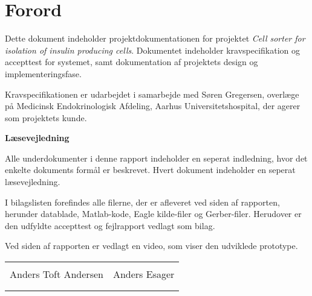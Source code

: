 \chapter*{Forord}

Dette dokument indeholder projektdokumentationen for projektet \textit{Cell sorter for isolation of insulin producing cells}. Dokumentet indeholder kravspecifikation og accepttest for systemet, samt dokumentation af projektets design og implementeringsfase. 

Kravspecifikationen er udarbejdet i samarbejde med Søren Gregersen, overlæge på Medicinsk Endokrinologisk Afdeling, Aarhus Universitetshospital, der agerer som projektets kunde. 

\textbf{Læsevejledning}

Alle underdokumenter i denne rapport indeholder en seperat indledning, hvor det enkelte dokuments formål er beskrevet. Hvert dokument indeholder en seperat læsevejledning. 

I bilagslisten forefindes alle filerne, der er afleveret ved siden af rapporten, herunder datablade, Matlab-kode, Eagle kilde-filer og Gerber-filer. Herudover er den udfyldte accepttest og fejlrapport vedlagt som bilag.

Ved siden af rapporten er vedlagt en video, som viser den udviklede prototype.


\phantom{Luft}

\phantom{Luft}

\begin{table}[H]
	\centering
		\begin{tabular}{c c}
			\underline{\phantom{mmmmmmmmmmmmmm}} & \underline{\phantom{mmmmmmmmmmmmmm}}  \\
			Anders Toft Andersen			& Anders Esager		 			\\
			&\\
			&\\

		 																									
		\end{tabular}
\end{table}
